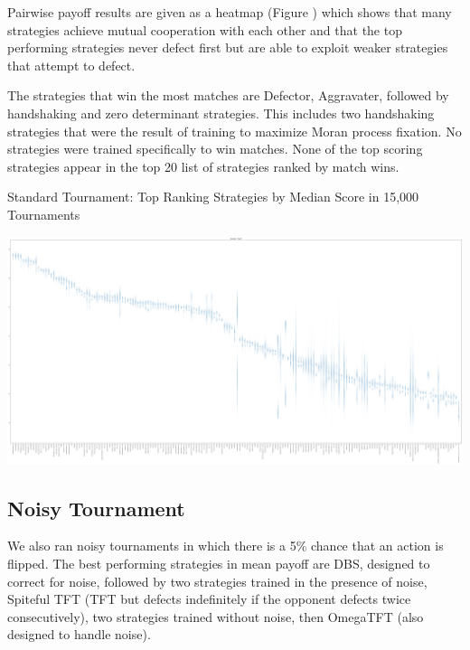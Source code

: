 \documentclass{article}
\begin{document}
Pairwise payoff results are given as a heatmap (Figure ) which
shows that many strategies achieve mutual cooperation with each other and
that the top performing strategies never defect first but are able to exploit
weaker strategies that attempt to defect.

The strategies that win the most matches are Defector, Aggravater, followed by
handshaking and zero determinant strategies. This includes two handshaking
strategies that were the result of training to maximize Moran process fixation.
No strategies were trained specifically to win matches. None of the top scoring
strategies appear in the top 20 list of strategies ranked by match wins.

\begin{table}[!hbtp]
    \centering
        
        \caption{Standard Tournament: Top Ranking Strategies by Median Score in 15,000 Tournaments}
        \label{tbl:standard_score}
\end{table}

\begin{landscape}
    \includegraphics[width=\paperwidth]{plots/Standard_boxplot.pdf}
\end{landscape}


\subsection{Noisy Tournament}

We also ran noisy tournaments in which there is a 5\% chance that an action
is flipped. The best performing strategies in mean payoff are DBS, designed
to correct for noise, followed by two strategies trained
in the presence of noise, Spiteful TFT (TFT but defects indefinitely if the
opponent defects twice consecutively), two strategies trained without noise, then
OmegaTFT (also designed to handle noise).
\end{document}
